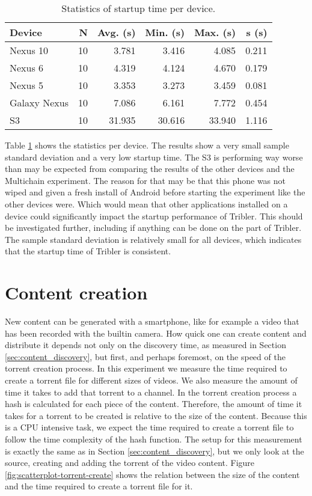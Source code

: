 \begin{table}[H]
	\begin{tabular}{l | *{5}{r}} \hline
		Device & N & Avg. (s) & Min. (s) & Max. (s) & s (s) \\ \hline \hline
		Nexus 10        & 10 & 3.781 & 3.416 & 4.085 & 0.211 \\ \hline
		Nexus 6          & 10 & 4.319 & 4.124 & 4.670 & 0.179 \\ \hline
		Nexus 5          & 10 & 3.353 & 3.273 & 3.459 & 0.081 \\ \hline
		Galaxy Nexus & 10 & 7.086 & 6.161 & 7.772 & 0.454 \\ \hline
		S3                   & 10 & 31.935 & 30.616 & 33.940 & 1.116 \\ \hline
	\end{tabular}
	\caption{Statistics of startup time per device.}
	\label{table:startup_time}
\end{table}
Table \ref{table:startup_time} shows the statistics per device.
The results show a very small sample standard deviation and a very low startup time.
The S3 is performing way worse than may be expected from comparing the results of the other devices and the Multichain experiment.
The reason for that may be that this phone was not wiped and given a fresh install of Android before starting the experiment like the other devices were.
Which would mean that other applications installed on a device could significantly impact the startup performance of Tribler.
This should be investigated further, including if anything can be done on the part of Tribler.
The sample standard deviation is relatively small for all devices, which indicates that the startup time of Tribler is consistent.


\section{Content creation}\label{sec:content_creation}
New content can be generated with a smartphone, like for example a video that has been recorded with the builtin camera.
How quick one can create content and distribute it depends not only on the discovery time, as measured in Section \ref{sec:content_discovery}, but first, and perhaps foremost, on the speed of the torrent creation process.
In this experiment we measure the time required to create a torrent file for different sizes of videos.
We also measure the amount of time it takes to add that torrent to a channel.
In the torrent creation process a hash is calculated for each piece of the content.
Therefore, the amount of time it takes for a torrent to be created is relative to the size of the content.
Because this is a CPU intensive task, we expect the time required to create a torrent file to follow the time complexity of the hash function.
The setup for this measurement is exactly the same as in Section \ref{sec:content_discovery}, but we only look at the source, creating and adding the torrent of the video content.
Figure \ref{fig:scatterplot-torrent-create} shows the relation between the size of the content and the time required to create a torrent file for it.

